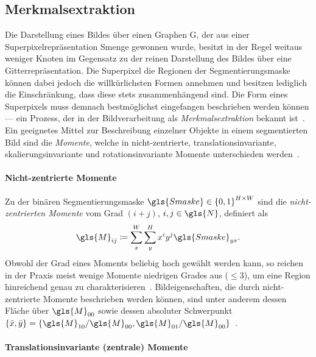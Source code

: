 \subsection{Merkmalsextraktion}
\label{merkmalsextraktion}

Die Darstellung eines Bildes über einen Graphen \gls{G}, der aus einer Superpixelrepräsentation \gls{Smenge} gewonnen wurde, besitzt in der Regel weitaus weniger Knoten im Gegensatz zu der reinen Darstellung des Bildes über eine Gitterrepräsentation.
Die Superpixel \bzw{} die Regionen der Segmentierungsmaske können dabei jedoch die willkürlichsten Formen annehmen und besitzen lediglich die Einschränkung, dass diese stets zusammenhängend sind.
Die Form eines Superpixels muss demnach bestmöglichst eingefangen \bzw{} beschrieben werden können — ein Prozess, der in der Bildverarbeitung als \emph{Merkmalsextraktion} bekannt ist~\cite{momente}.
Ein geeignetes Mittel zur Beschreibung einzelner Objekte in einem segmentierten Bild sind die \emph{Momente}, welche in nicht-zentrierte, translationsinvariante, skalierungsinvariante und rotationsinvariante Momente unterschieden werden~\cite{momente}.

\paragraph{Nicht-zentrierte Momente}
\label{nicht_zentrierte_momente}

Zu der binären Segmentierungsmaske $\gls{Smaske} \in {\left\{0, 1\right\}}^{H \times W}$ sind die \emph{nicht-zentrierten Momente} vom Grad $\left(i+j\right)$, $i,j\in\gls{N}$, definiert als~\cite{momente}
\begin{equation*}
  \gls{M}_{ij} \coloneqq \sum_x^W \sum_y^H x^i y^j \gls{Smaske}_{yx}.
\end{equation*}
Obwohl der Grad eines Moments beliebig hoch gewählt werden kann, so reichen in der Praxis meist wenige Momente niedrigen Grades aus ($\le 3$), um eine Region hinreichend genau zu charakterisieren~\cite{momente}.
Bildeigenschaften, die durch nicht-zentrierte Momente beschrieben werden können, sind unter anderem dessen Fläche über $\gls{M}_{00}$ sowie dessen absoluter Schwerpunkt $\left\{\bar{x}, \bar{y}\right\} = \left\{ \gls{M}_{10}/\gls{M}_{00}, \gls{M}_{01}/\gls{M}_{00}\right\}$~\cite{momente}.

\paragraph{Translationsinvariante (zentrale) Momente}
\label{translationsinvariante_momente}

